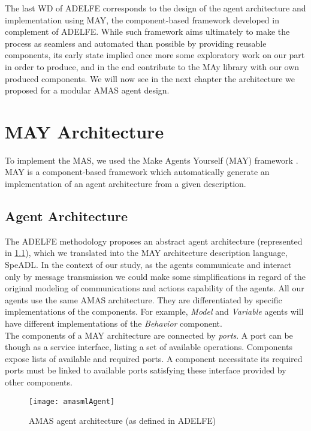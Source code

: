 The last WD of ADELFE corresponds to the design of the agent architecture and implementation using MAY, the component-based framework developed in complement of ADELFE. While such framework aims ultimately to make the process as seamless and  automated than possible by providing reusable components, its early state implied once more some exploratory work on our part in order to produce, and in the end contribute to the MAy library with our own produced components. We will now see in the next chapter the architecture we proposed for a modular AMAS agent design.

\chapter{MAY Architecture}

To implement the MAS, we used the Make Agents Yourself (MAY) framework  \cite{No2012.2}. MAY is a component-based framework which automatically generate an implementation of an agent architecture from a given description.

\section{Agent Architecture}

The ADELFE methodology proposes an abstract agent architecture (represented in \figurename{} \ref{AMAS-ML_agent}), which we translated into the MAY architecture description language, SpeADL. In the context of our study, as the agents communicate and interact only by message transmission we could make some simplifications in regard of the original modeling of communications and actions capability of the agents. All our agents use the same AMAS architecture. They are differentiated by specific implementations of the components. For example, \emph{Model} and \emph{Variable} agents will have different implementations of the \emph{Behavior} component.\\
The components of a MAY architecture are connected by \emph{ports}. A port can be though as a service interface, listing a set of available operations. Components expose lists of available and required ports. A component necessitate its required ports must be linked to available ports satisfying these interface provided by other components.

\begin{figure}
\centering
\texttt{[image: amasmlAgent]}
\caption{AMAS agent architecture (as defined in ADELFE)}\label{AMAS-ML_agent}
\end{figure}

